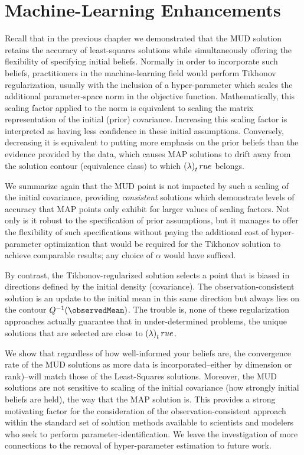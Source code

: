 \section{Machine-Learning Enhancements}\label{sec:ch05-ml}

Recall that in the previous chapter we demonstrated that the MUD solution retains the accuracy of least-squares solutions while simultaneously offering the flexibility of specifying initial beliefs.
Normally in order to incorporate such beliefs, practitioners in the machine-learning field would perform Tikhonov regularization, usually with the inclusion of a hyper-parameter which scales the additional parameter-space norm in the objective function.
Mathematically, this scaling factor applied to the norm is equivalent to scaling the matrix representation of the initial (prior) covariance.
Increasing this scaling factor is interpreted as having less confidence in these initial assumptions.
Conversely, decreasing it is equivalent to putting more emphasis on the prior beliefs than the evidence provided by the data, which causes MAP solutions to drift away from the solution contour (equivalence class) to which $\left ( \lambda \right )_true$ belongs.

We summarize again that the MUD point is not impacted by such a scaling of the initial covariance, providing \emph{consistent} solutions which demonstrate levels of accuracy that MAP points only exhibit for larger values of scaling factors.
Not only is it robust to the specification of prior assumptions, but it manages to offer the flexibility of such specifications without paying the additional cost of hyper-parameter optimization that would be required for the Tikhonov solution to achieve comparable results; any choice of $\alpha$ would have sufficed.

By contrast, the Tikhonov-regularized solution selects a point that is biased in directions defined by the initial density (covariance).
The observation-consistent solution is an update to the initial mean in this same direction but always lies on the contour $Q^{-1}(\observedMean)$.
The trouble is, none of these regularization approaches actually guarantee that in under-determined problems, the unique solutions that are selected are close to $\left ( \lambda \right )_true$.

We show that regardless of how well-informed your beliefs are, the convergence rate of the MUD solutions as more data is incorporated\---either by dimension or rank)\---will match those of the Least-Squares solutions.
Moreover, the MUD solutions are not sensitive to scaling of the initial covariance (how strongly initial beliefs are held), the way that the MAP solution is.
This provides a strong motivating factor for the consideration of the observation-consistent approach within the standard set of solution methods available to scientists and modelers who seek to perform parameter-identification.
We leave the investigation of more connections to the removal of hyper-parameter estimation to future work.

